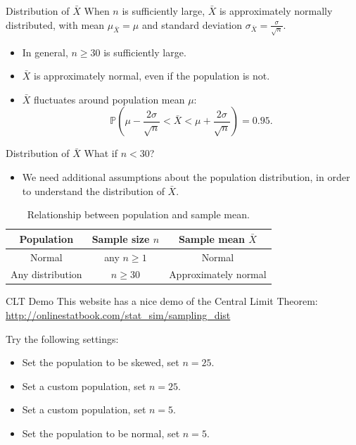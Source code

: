 \documentclass{beamer}
\newcommand{\pr}{\mathbb{P}}
\begin{document}
\begin{frame}{Distribution of $\bar X$}
    When $n$ is sufficiently large, $\bar X$ is approximately normally distributed, 
    with mean $\mu_{\bar X} = \mu$ and standard deviation $\sigma_{\bar X} = \frac{\sigma}{\sqrt{n}}$.

    \begin{itemize}
        \item In general, $n \geq 30$ is sufficiently large.
        \item $\bar X$ is approximately normal, even if the population is not.
        \item   $\bar X$ fluctuates around population mean $\mu$:
        $$ \pr(\mu-\frac{2\sigma}{\sqrt{n}} < \bar X < \mu+\frac{2\sigma}{\sqrt{n}}) = 0.95.$$

    \end{itemize}
    
\end{frame}


\begin{frame}{Distribution of $\bar X$}
    What if $n<30$?
    \begin{itemize}
        \item We need additional assumptions about the population distribution, in order to understand the distribution of $\bar X$.
    \end{itemize}

    \begin{table}\caption{Relationship between population and sample mean.}
        \begin{center}
            \begin{tabular}{|c|c|c|}
                \hline
                \textbf{Population} & \textbf{Sample size $n$} & \textbf{Sample mean $\bar X$} \\\hline
                Normal & any $n\geq 1$ & Normal \\\hline
                Any distribution & $n\geq 30$ & Approximately normal \\\hline
            \end{tabular}
        \end{center}\end{table}

\end{frame}


\begin{frame}{CLT Demo}
    This website has a nice demo of the Central Limit Theorem:
    \url{http://onlinestatbook.com/stat_sim/sampling_dist}

Try the following settings:
\begin{itemize}
    \item Set the population to be skewed, set $n=25$.
    \item Set a custom population, set $n=25$.
    \item Set a custom population, set $n=5$.
    \item Set the population to be normal, set $n=5$.
\end{itemize}
\end{frame}
\end{document}
